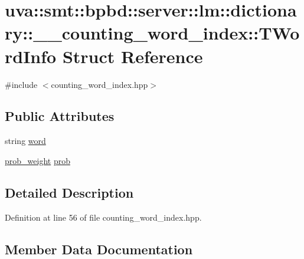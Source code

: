 \hypertarget{structuva_1_1smt_1_1bpbd_1_1server_1_1lm_1_1dictionary_1_1____counting__word__index_1_1_t_word_info}{}\section{uva\+:\+:smt\+:\+:bpbd\+:\+:server\+:\+:lm\+:\+:dictionary\+:\+:\+\_\+\+\_\+counting\+\_\+word\+\_\+index\+:\+:T\+Word\+Info Struct Reference}
\label{structuva_1_1smt_1_1bpbd_1_1server_1_1lm_1_1dictionary_1_1____counting__word__index_1_1_t_word_info}


{\ttfamily \#include $<$counting\+\_\+word\+\_\+index.\+hpp$>$}

\subsection*{Public Attributes}
\begin{DoxyCompactItemize}
\item 
string \hyperlink{structuva_1_1smt_1_1bpbd_1_1server_1_1lm_1_1dictionary_1_1____counting__word__index_1_1_t_word_info_ade7f9a66782c83f4837c18021c621d38}{word}
\item 
\hyperlink{namespaceuva_1_1smt_1_1bpbd_1_1server_a01e9ea4de9c226f4464862e84ff0bbcc}{prob\+\_\+weight} \hyperlink{structuva_1_1smt_1_1bpbd_1_1server_1_1lm_1_1dictionary_1_1____counting__word__index_1_1_t_word_info_ad39acbec02b2bde9c70dd413eefced65}{prob}
\end{DoxyCompactItemize}


\subsection{Detailed Description}


Definition at line 56 of file counting\+\_\+word\+\_\+index.\+hpp.



\subsection{Member Data Documentation}
\hypertarget{structuva_1_1smt_1_1bpbd_1_1server_1_1lm_1_1dictionary_1_1____counting__word__index_1_1_t_word_info_ad39acbec02b2bde9c70dd413eefced65}{}
